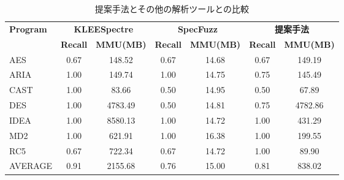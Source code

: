 \begin{table}[htbp]
  \centering
  \caption{提案手法とその他の解析ツールとの比較}
  \label{all_comparison}
  \begin{tabular}{l|cc|cc|cc}
    \hline
    \multirow{2}{*}{\textbf{Program}} & 
    \multicolumn{2}{c|}{\textbf{KLEESpectre}} & 
    \multicolumn{2}{c|}{\textbf{SpecFuzz}} & 
    \multicolumn{2}{c}{\textbf{提案手法}} \\
    \cline{2-7}
    & \textbf{Recall} & \textbf{MMU(MB)} & 
    \textbf{Recall} &  \textbf{MMU(MB)} & 
    \textbf{Recall} &  \textbf{MMU(MB)} \\
    \hline
    AES   & 0.67 & 148.52  & 0.67 & 14.68 & 0.67 & 149.19 \\
    ARIA  & 1.00 & 149.74  & 1.00 & 14.75 & 0.75 & 145.49 \\
    CAST  & 1.00 & 83.66   & 0.50 & 14.95 & 0.50 & 67.89 \\
    DES   & 1.00 & 4783.49 & 0.50 & 14.81 & 0.75 & 4782.86 \\
    IDEA  & 1.00 & 8580.13 & 1.00 & 14.72 & 1.00 & 431.29 \\
    MD2   & 1.00 & 621.91  & 1.00 & 16.38 & 1.00 & 199.55 \\
    RC5   & 0.67 & 722.34  & 0.67 & 14.72 & 1.00 & 89.90 \\
    \midrule
    AVERAGE & 0.91 & 2155.68 & 0.76 & 15.00 & 0.81 & 838.02\\
    \hline
  \end{tabular}
\end{table}


